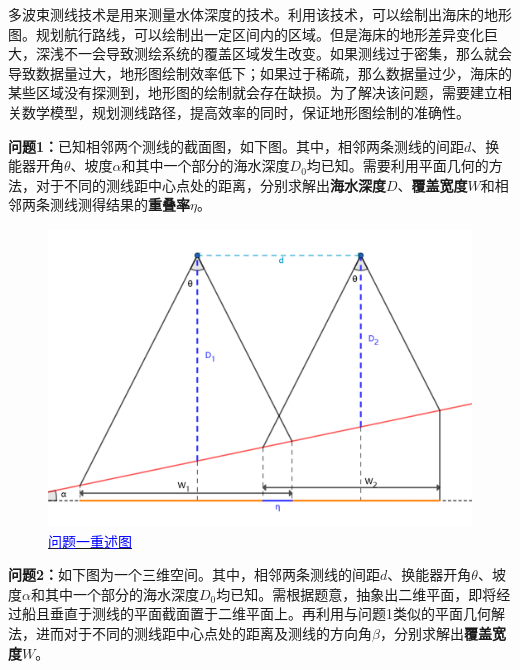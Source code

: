 \setcounter{page}{1}




多波束测线技术是用来测量水体深度的技术。利用该技术，可以绘制出海床的地形图。规划航行路线，可以绘制出一定区间内的区域。但是海床的地形差异变化巨大，深浅不一会导致测绘系统的覆盖区域发生改变。如果测线过于密集，那么就会导致数据量过大，地形图绘制效率低下；如果过于稀疏，那么数据量过少，海床的某些区域没有探测到，地形图的绘制就会存在缺损。为了解决该问题，需要建立相关数学模型，规划测线路径，提高效率的同时，保证地形图绘制的准确性。


\textbf{问题1：}已知相邻两个测线的截面图，如下图。其中，相邻两条测线的间距$d$、换能器开角$\theta$、坡度$\alpha$和其中一个部分的海水深度$D_0$均已知。需要利用平面几何的方法，对于不同的测线距中心点处的距离，分别求解出\textbf{海水深度}$D$、\textbf{覆盖宽度}$W$和相邻两条测线测得结果的\textbf{重叠率}$\eta$。

\begin{figure}[h]   
    \centering
    \includegraphics[scale=0.3]{res/img/问题一重述图.png}
    \caption{\href{https://www.geogebra.org/m/fza22fcy}{\textcolor{blue}{问题一重述图}}}
    \label{fig:问题一重述图}
\end{figure}

\textbf{问题2：}如下图为一个三维空间。其中，相邻两条测线的间距$d$、换能器开角$\theta$、坡度$\alpha$和其中一个部分的海水深度$D_0$均已知。需根据题意，抽象出二维平面，即将经过船且垂直于测线的平面截面置于二维平面上。再利用与问题1类似的平面几何解法，进而对于不同的测线距中心点处的距离及测线的方向角$\beta$，分别求解出\textbf{覆盖宽度}$W$。

